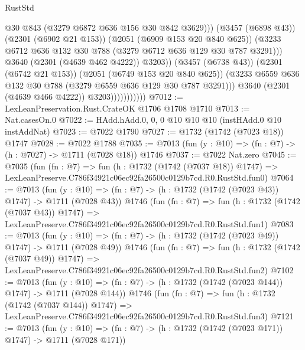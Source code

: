 \begin{lexlean}{RustStd}
\begin{coremodule}
                                      @30
                                      @843
                                      (@3279 @6872 @636 @156 @30 @842 @3629)))
                                  (@3457 (@6898 @43))
                                  (@2301 (@6902 @21 @153))
                                  (@2051 (@6909 @153 @20 @840 @625))
                                  (@3233
                                    @6712
                                    @636
                                    @132
                                    @30
                                    @788
                                    (@3279 @6712 @636 @129 @30 @787 @3291)))
                                @3640
                                (@2301 (@4639 @462 @4222))
                                @3203))
                            (@3457 (@6738 @43))
                            (@2301 (@6742 @21 @153))
                            (@2051 (@6749 @153 @20 @840 @625))
                            (@3233 @6559 @636 @132 @30 @788 (@3279 @6559 @636 @129 @30 @787 @3291)))
                          @3640
                          (@2301 (@4639 @466 @4222))
                          @3203)))))))))))
@7012 := LexLeanPreservation.Rust.CrateOK @1706 @1708 @1710
@7013 := Nat.casesOn.{0}
@7022 := HAdd.hAdd.{0, 0, 0} @10 @10 @10 (instHAdd.{0} @10 instAddNat)
@7023 := @7022 @1790
@7027 := @1732 (@1742 (@7023 @18)) @1747
@7028 := @7022 @1788
@7035 := @7013 (fun (y : @10) => (fn : @7) -> (h : @7027) -> @1711 (@7028 @18)) @1746
@7037 := @7022 Nat.zero
@7045 := @7035
    (fun (fn : @7) =>
    fun (h : @1732 (@1742 (@7037 @18)) @1747) =>
    LexLeanPreserve.C786f34921c06ec92fa26500c0129b7cd.R0.RustStd.fun0)
@7064 := @7013
    (fun (y : @10) => (fn : @7) -> (h : @1732 (@1742 (@7023 @43)) @1747) -> @1711 (@7028 @43))
    @1746
    (fun (fn : @7) =>
    fun (h : @1732 (@1742 (@7037 @43)) @1747) =>
    LexLeanPreserve.C786f34921c06ec92fa26500c0129b7cd.R0.RustStd.fun1)
@7083 := @7013
    (fun (y : @10) => (fn : @7) -> (h : @1732 (@1742 (@7023 @49)) @1747) -> @1711 (@7028 @49))
    @1746
    (fun (fn : @7) =>
    fun (h : @1732 (@1742 (@7037 @49)) @1747) =>
    LexLeanPreserve.C786f34921c06ec92fa26500c0129b7cd.R0.RustStd.fun2)
@7102 := @7013
    (fun (y : @10) => (fn : @7) -> (h : @1732 (@1742 (@7023 @144)) @1747) -> @1711 (@7028 @144))
    @1746
    (fun (fn : @7) =>
    fun (h : @1732 (@1742 (@7037 @144)) @1747) =>
    LexLeanPreserve.C786f34921c06ec92fa26500c0129b7cd.R0.RustStd.fun3)
@7121 := @7013
    (fun (y : @10) => (fn : @7) -> (h : @1732 (@1742 (@7023 @171)) @1747) -> @1711 (@7028 @171))

\end{coremodule}
\end{lexlean}
